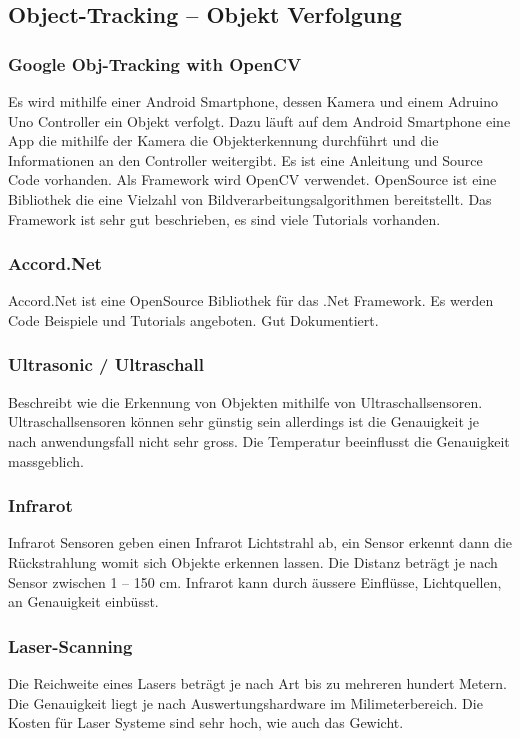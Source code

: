 \subsection{Object-Tracking – Objekt Verfolgung}
\subsubsection{Google Obj-Tracking with OpenCV}
Es wird mithilfe einer Android Smartphone, dessen Kamera und einem Adruino Uno Controller ein Objekt verfolgt. Dazu läuft auf dem Android Smartphone eine App die mithilfe der Kamera die Objekterkennung durchführt und die Informationen an den Controller weitergibt. Es ist eine Anleitung und Source Code vorhanden. Als Framework wird OpenCV verwendet. OpenSource ist eine Bibliothek die eine Vielzahl von Bildverarbeitungsalgorithmen bereitstellt. Das Framework ist sehr gut beschrieben, es sind viele Tutorials vorhanden.

\subsubsection{Accord.Net}
Accord.Net ist eine OpenSource Bibliothek für das .Net Framework. Es werden Code Beispiele und Tutorials angeboten. Gut Dokumentiert.

\subsubsection{Ultrasonic / Ultraschall }
Beschreibt wie die Erkennung von Objekten mithilfe von Ultraschallsensoren. Ultraschallsensoren können sehr günstig sein allerdings ist die Genauigkeit je nach anwendungsfall nicht sehr gross. Die Temperatur beeinflusst die Genauigkeit massgeblich. 

\subsubsection{Infrarot}
Infrarot Sensoren geben einen Infrarot Lichtstrahl ab, ein Sensor erkennt dann die Rückstrahlung womit sich Objekte erkennen lassen. Die Distanz beträgt je nach Sensor zwischen 1 – 150 cm. Infrarot kann durch äussere Einflüsse, Lichtquellen, an Genauigkeit einbüsst.

\subsubsection{Laser-Scanning}
Die Reichweite eines Lasers beträgt je nach Art bis zu mehreren hundert Metern. Die Genauigkeit liegt je nach Auswertungshardware im Milimeterbereich. Die Kosten für Laser Systeme sind sehr hoch, wie auch das Gewicht.

